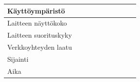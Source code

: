\documentclass[finnish, 12pt, a4paper, elec, utf8, a-1b, online]{aaltothesis}
\begin{document}
{\begin{longtable}{p{2.5cm}|p{6cm}|p{0.5cm}p{0.5cm}p{0.5cm}|p{0.5cm}|p{0.5cm}p{0.5cm}p{0.5cm}|p{0.5cm}|}
        \midrule
        \textbf{Käyttöympäristö}                                                                                                                                                                                                                                                                                                                                                                                                    \\
        \midrule
        Laitteen näyttökoko                                                                                                                                                                                                                                                                                                                                                                                                         \\
        \midrule
        Laitteen suorituskyky                                                                                                                                                                                                                                                                                                                                                                                                       \\
        \midrule
        Verkkoyhteyden laatu                                                                                                                                                                                                                                                                                                                                                                                                        \\
        \midrule
        Sijainti                                                                                                                                                                                                                                                                                                                                                                                                                    \\
        \midrule
        Aika                                                                                                                                                                                                                                                                                                                                                                                                                        \\

\end{longtable}}
\end{document}
